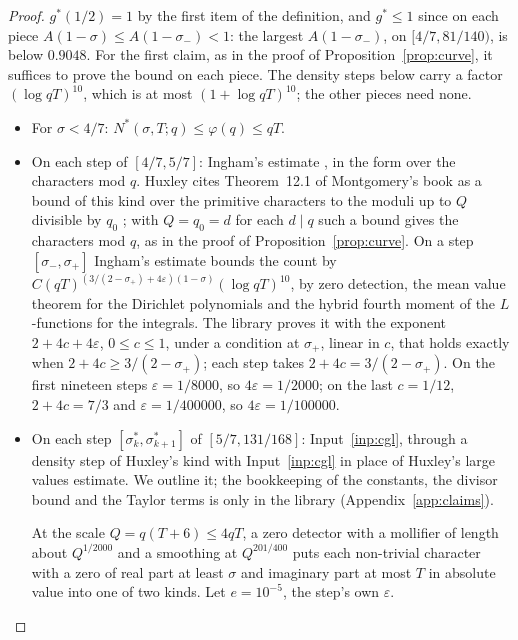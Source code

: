 \documentclass[11pt]{article}
\theoremstyle{definition}
\begin{document}
\begin{proof}
$g^*(1/2) = 1$ by the first item of the definition, and $g^* \le 1$ since on each piece $A(1 - \sigma) \le A(1 -
\sigma_-) < 1$: the largest $A(1 - \sigma_-)$, on $[4/7, 81/140)$, is below $0.9048$. For the first claim, as in the
proof of Proposition~\ref{prop:curve}, it suffices to prove the
bound on each piece. The density steps below carry a factor $(\log qT)^{10}$, which is at most $(1 + \log qT)^{10}$;
the other pieces need none.
\begin{itemize}
\item For $\sigma < 4/7$: $N^*(\sigma, T; q) \le \varphi(q) \le qT$.
\item On each step of $[4/7, 5/7]$: Ingham's estimate \cite{ingham}, in the form over the characters mod $q$. Huxley
  cites Theorem~12.1 of Montgomery's book \cite{montgomery-topics} as a bound of this kind over the primitive
  characters to the moduli up to $Q$ divisible by $q_0$ \cite[p.~435]{huxley75}; with $Q = q_0 = d$ for each $d \mid
  q$ such a bound gives the characters mod $q$, as in the proof of Proposition~\ref{prop:curve}. On a step
  $[\sigma_-, \sigma_+]$ Ingham's estimate bounds the count by
  $C(qT)^{(3/(2 - \sigma_+) + 4\varepsilon)(1 - \sigma)} (\log qT)^{10}$, by zero detection, the mean value theorem
  for the Dirichlet polynomials and the hybrid fourth moment of the $L$-functions for the integrals. The library
  proves it with the exponent $2 + 4c + 4\varepsilon$, $0 \le c \le 1$, under a condition at $\sigma_+$, linear in
  $c$, that holds exactly when $2 + 4c \ge 3/(2 - \sigma_+)$; each step takes $2 + 4c = 3/(2 - \sigma_+)$. On the
  first nineteen steps
  $\varepsilon = 1/8000$, so $4\varepsilon = 1/2000$; on the last $c = 1/12$, $2 + 4c = 7/3$ and
  $\varepsilon = 1/400000$, so $4\varepsilon = 1/100000$.
\item On each step $[\sigma^*_k, \sigma^*_{k+1}]$ of $[5/7, 131/168]$: Input~\ref{inp:cgl}, through a density step
  of Huxley's kind with Input~\ref{inp:cgl} in place of Huxley's large values estimate. We outline it; the
  bookkeeping of the constants, the divisor bound and the Taylor terms is only in the library
  (Appendix~\ref{app:claims}).

  At the scale $Q = q(T + 6) \le 4qT$, a zero detector with a mollifier of length about $Q^{1/2000}$ and a
  smoothing at $Q^{201/400}$ puts each non-trivial character with a zero of real part at least $\sigma$ and imaginary
  part at most $T$ in absolute value into one of two kinds. Let $e = 10^{-5}$, the step's own $\varepsilon$.


\end{itemize}
\end{proof}
\end{document}
